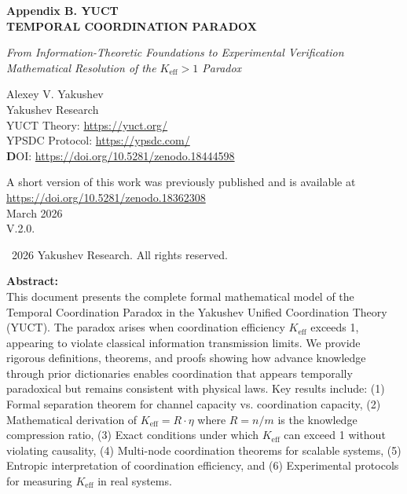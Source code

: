 \documentclass[12pt]{article}
\begin{document}
	\begin{titlepage}
		\begin{center}
			\vspace*{0cm}
			\Huge\textbf{Appendix B. YUCT\\
				TEMPORAL COORDINATION PARADOX}
			
			\vspace{0cm}
			\LARGE\textit{From Information-Theoretic Foundations to Experimental Verification \\
				Mathematical Resolution of the $K_{\text{eff}} > 1$ Paradox}
			
			\vspace{1cm}
			\Large
			Alexey V. Yakushev\\
			Yakushev Research\\
	YUCT Theory: \url{https://yuct.org/}\\
YPSDC Protocol: \url{https://ypsdc.com/}\\


\vspace{2cm}
\textbf DOI: \url{https://doi.org/10.5281/zenodo.18444598}\\

\vspace{1cm}

\vspace{0cm}
\large 
A short version of this work was previously published and is available at\\ \url{https://doi.org/10.5281/zenodo.18362308}\\
\vspace{1cm}
March 2026 \\ \large V.2.0.
			
			\vspace{5cm}
			\textcopyright~2026 Yakushev Research. All rights reserved.
			
			\newpage
			\vfill
			\normalsize
			\begin{minipage}{0.8\textwidth}
				\centering
				\textbf{Abstract:} \\ This document presents the complete formal mathematical model of the Temporal Coordination Paradox in the Yakushev Unified Coordination Theory (YUCT). The paradox arises when coordination efficiency $K_{\text{eff}}$ exceeds 1, appearing to violate classical information transmission limits. We provide rigorous definitions, theorems, and proofs showing how advance knowledge through prior dictionaries enables coordination that appears temporally paradoxical but remains consistent with physical laws. Key results include: (1) Formal separation theorem for channel capacity vs. coordination capacity, (2) Mathematical derivation of $K_{\text{eff}} = R \cdot \eta$ where $R = n/m$ is the knowledge compression ratio, (3) Exact conditions under which $K_{\text{eff}}$ can exceed 1 without violating causality, (4) Multi-node coordination theorems for scalable systems, (5) Entropic interpretation of coordination efficiency, and (6) Experimental protocols for measuring $K_{\text{eff}}$ in real systems.
			\end{minipage}
			

\end{center}
\end{titlepage}
\end{document}
